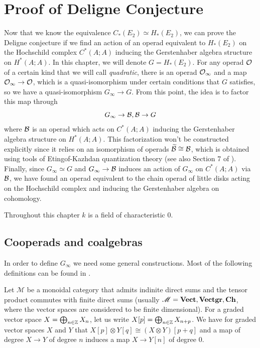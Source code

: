 \documentclass[TFM.tex]{subfiles}
\begin{document}
\chapter{Proof of Deligne Conjecture}


Now that we know the equivalence $C_*(E_2)\simeq H_*(E_2)$, we can prove the Deligne conjecture if we find an action of an operad equivalent to $H_*(E_2)$ on the Hochschild complex $C^*(A;A)$ inducing the Gerstenhaber algebra structure on $H^*(A;A)$. In this chapter, we will denote $G=H_*(E_2)$. For any operad ${\mathcal O}$ of a certain kind that we will call \emph{quadratic}, there is an operad ${\mathcal O}_\infty$ and a map ${\mathcal O}_\infty\to{\mathcal O}$, which is a quasi-isomorphism under certain conditions that $G$ satisfies, so we have a quasi-isomorphism $G_\infty\to G$. From this point, the idea is to factor this map through
\[
G_\infty\to \mathcal{B},\mathcal{B}\to G
\]
where $\mathcal{B}$ is an operad which acts on $C^*(A;A)$ inducing the Gerstenhaber algebra structure on $H^*(A;A)$.  This factorization won't be constructed explicitly since it relies on an isomorphism of operads $\widetilde{\mathcal{B}}\cong\mathcal{B}$, which is obtained using tools of Etingof-Kazhdan quantization theory \cite{EK} (see also Section 7 of \cite{Hinich}). Finally, since $G_\infty\simeq G$ and $G_\infty\to\mathcal{B}$ induces an action of $G_\infty$ on $C^*(A;A)$ via $\mathcal{B}$, we have found an operad equivalent to the chain operad of little disks acting on the Hochschild complex and inducing the Gerstenhaber algebra on cohomology. 

Throughout this chapter $k$ is a field of characteristic 0. 


\section{Cooperads and coalgebras}


In order to define $G_\infty$ we need some general constructions. Most of the following definitions can be found in \cite{Hinich}. 

Let $\mathscr{M}$ be a monoidal category that admits indinite direct sums and the tensor product commutes with finite direct sums (usually $\mathscr{M}=\mathrm{\mathbf{Vect}}, \mathrm{\mathbf{Vectgr}},\mathrm{\mathbf{Ch}}$, where the vector spaces are considered to be finite dimensional). For a graded vector space $X=\bigoplus_{n\in\mathbb{Z}}X_n$, let us write $X[p]=\bigoplus_{n\in\mathbb{Z}}X_{n+p}$. We have for graded vector spaces $X$ and $Y$ that $X[p]\otimes Y[q]\cong (X\otimes Y)[p+q]$ and a map of degree $X\to Y$ of degree $n$ induces a map $X\to Y[n]$ of degree 0. 
\end{document}
